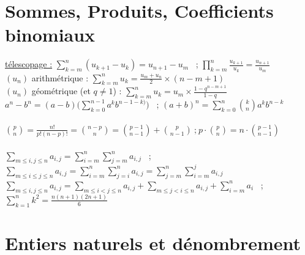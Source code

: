 \documentclass[12 pt]{exampleclass}
\begin{document}
\newpage
\section{Sommes, Produits, Coefficients binomiaux}

\begin{flushleft}
\begin{doublespace}

	\underline{télescopage :} $\sum\limits_{k = m}^n (u_{k+1} - u_k) = u_{n+1} - u_m$ \ ; $\prod\limits_{k=m}^n \frac{u_{k+1}}{u_k} = \frac{u_{n+1}}{u_m}$\\
	$(u_n)$ arithmétrique : $\sum\limits_{k = m}^n u_k = \frac{u_m + u_n}{2} \times (n-m+1)$ \\
	$(u_n)$ géométrique (et $q\ne 1$) : $\sum\limits_{k = m}^n u_k = u_m \times \frac{1 - q^{n-m+1}}{1-q}$\\
	$a^n-b^n = (a-b)\Big(\sum\limits_{k=0}^{n-1} a^k b^{n-1-k)}\Big)$ \ ; $(a+b)^n = \sum\limits_{k=0}^n \binom{k}{n} a^k b^{n-k}$\\
	\text{ } \\
	$\binom{p}{n} = \frac{n!}{p!(n-p)!} = \binom{n-p}{n} = \binom{p-1}{n-1}+\binom{p}{n-1}  \ \text{;} \ p\cdot\binom{p}{n} = n\cdot\binom{p-1}{n-1}$\\
	\text{}\\
	$\sum\limits_{m\leq i,j\leq n} a_{i,j} = \sum\limits_{i=m}^n \sum\limits_{j=m}^n a_{i,j}$ \ ; $\sum\limits_{m\leq i \leq j \leq n} a_{i,j} = \sum\limits_{i=m}^n \sum\limits_{j=i}^n a_{i,j} = \sum\limits_{j=m}^n \sum\limits_{i=m}^j a_{i,j}$\\
	$\sum\limits_{m\leq i,j \leq n} a_{i,j} = \sum\limits_{m \leq i<j\leq n} a_{i,j} + \sum\limits_{m\leq j < i \leq n} a_{i,j} + \sum\limits_{i=m}^n a_i$ \ ; $\sum\limits_{k=1}^n k^2 = \frac{n(n+1)(2n+1)}{6}$\\

\end{doublespace}
\end{flushleft}

\section{Entiers naturels et dénombrement}
\end{document}
